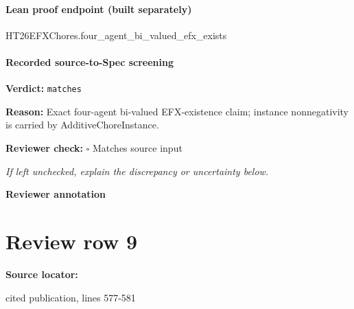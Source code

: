 \documentclass[10pt]{article}
\newcommand{\reviewerbox}{%
  \par\noindent\fbox{\parbox{0.96\linewidth}{\rule{0pt}{0.38in}}}\par
}
\newcommand{\reviewmatch}[1]{%
  \par\noindent\textbf{Reviewer check:} $\square$\; #1\par
  \noindent\emph{If left unchecked, explain the discrepancy or uncertainty below.}\par
}
\begin{document}
\paragraph{Lean proof endpoint (built separately)}\begin{ReviewVerbatim}
HT26EFXChores.four_agent_bi_valued_efx_exists
\end{ReviewVerbatim}

\paragraph{Recorded source-to-Spec screening}
\textbf{Verdict:} \texttt{matches}
\\
{\raggedright
\textbf{Reason:} Exact four-\allowbreak{}agent bi-\allowbreak{}valued EFX-\allowbreak{}existence claim;\allowbreak{} instance nonnegativity is carried by AdditiveChoreInstance.\allowbreak{}
\par}
\reviewmatch{Matches source input}
\noindent\textbf{Reviewer annotation}\par
\reviewerbox
\clearpage
\hypertarget{source-claim-e126eba4635c1cd5}{}
\section*{Review row 9}
\textbf{Source locator:} {\footnotesize\raggedright cited publication, lines 577-\allowbreak{}581\par}
\end{document}

